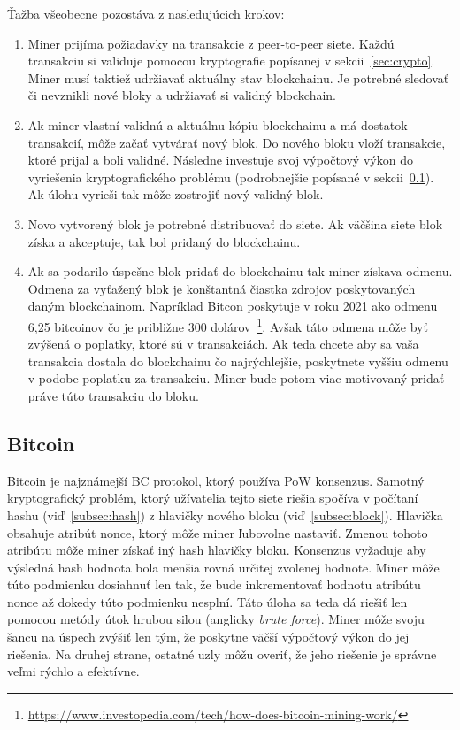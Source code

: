 Ťažba všeobecne pozostáva z nasledujúcich krokov:
\begin{enumerate}
	\item Miner prijíma požiadavky na transakcie z peer-to-peer siete. Každú transakciu si validuje pomocou kryptografie popísanej v sekcii~\ref{sec:crypto}. Miner musí taktiež udržiavať aktuálny stav blockchainu. Je potrebné sledovať či nevznikli nové bloky a udržiavať si validný blockchain.
	\item Ak miner vlastní validnú a aktuálnu kópiu blockchainu a má dostatok transakcií, môže začať vytvárať nový blok. Do nového bloku vloží transakcie, ktoré prijal a boli validné. Následne investuje svoj výpočtový výkon do vyriešenia kryptografického problému (podrobnejšie popísané v sekcii~\ref{subsec:bitcoin}). Ak úlohu vyrieši tak môže zostrojiť nový validný blok.
	\item Novo vytvorený blok je potrebné distribuovať do siete. Ak väčšina siete blok získa a akceptuje, tak bol pridaný do blockchainu.
	\item Ak sa podarilo úspešne blok pridať do blockchainu tak miner získava odmenu. Odmena za vyťažený blok je konštantná čiastka zdrojov poskytovaných daným blockchainom. Napríklad Bitcon poskytuje v roku 2021 ako odmenu 6,25 bitcoinov čo je približne 300 dolárov~\footnote{\url{https://www.investopedia.com/tech/how-does-bitcoin-mining-work/}}. Avšak táto odmena môže byť zvýšená o poplatky, ktoré sú v transakciách. Ak teda chcete aby sa vaša transakcia dostala do blockchainu čo najrýchlejšie, poskytnete vyššiu odmenu v podobe poplatku za transakciu. Miner bude potom viac motivovaný pridať práve túto transakciu do bloku.
\end{enumerate}

\subsection{Bitcoin}\label{subsec:bitcoin}
Bitcoin je najznámejší BC protokol, ktorý používa PoW konsenzus. Samotný kryptografický problém, ktorý užívatelia tejto siete riešia spočíva v počítaní hashu (viď~\ref{subsec:hash}) z hlavičky nového bloku (viď~\ref{subsec:block}). Hlavička obsahuje atribút nonce, ktorý môže miner ľubovolne nastaviť. Zmenou tohoto atribútu môže miner získať iný hash hlavičky bloku. Konsenzus vyžaduje aby výsledná hash hodnota bola menšia rovná určitej zvolenej hodnote. Miner môže túto podmienku dosiahnuť len tak, že bude inkrementovať hodnotu atribútu nonce až dokedy túto podmienku nesplní. Táto úloha sa teda dá riešiť len pomocou metódy útok hrubou silou (anglicky \textit{brute force}). Miner môže svoju šancu na úspech zvýšiť len tým, že poskytne väčší výpočtový výkon do jej riešenia. Na druhej strane, ostatné uzly môžu overiť, že jeho riešenie je správne veľmi rýchlo a efektívne.~\cite{zhengBlockchainOverview}

